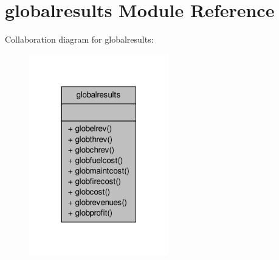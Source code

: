 \hypertarget{classglobalresults}{\section{globalresults Module Reference}
\label{classglobalresults}
}


Collaboration diagram for globalresults\-:\nopagebreak
\begin{figure}[H]
\begin{center}
\leavevmode
\includegraphics[width=172pt]{classglobalresults__coll__graph}
\end{center}
\end{figure}
